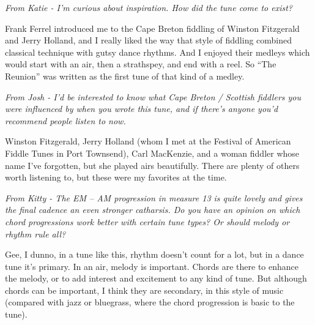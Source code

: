 \documentclass[10pt]{article}
\begin{document}
{\begin{minipage}{7.0in}
   \textit{From Katie - I'm curious about inspiration. How did the tune come to exist?}

   Frank Ferrel introduced me to the Cape Breton fiddling of Winston
   Fitzgerald and Jerry Holland, and I really liked the way that style
   of fiddling combined classical technique with gutsy dance
   rhythms. And I enjoyed their medleys which would start with an air,
   then a strathspey, and end with a reel. So ``The Reunion'' was
   written as the first tune of that kind of a medley.

   \textit{From Josh - I'd be interested to know what Cape Breton /
     Scottish fiddlers you were influenced by when you wrote this
     tune, and if there's anyone you'd recommend people listen to
     now.}

   Winston Fitzgerald, Jerry Holland (whom I met at the Festival of
   American Fiddle Tunes in Port Townsend), Carl MacKenzie, and a
   woman fiddler whose name I've forgotten, but she played airs
   beautifully. There are plenty of others worth listening to, but
   these were my favorites at the time.

   \textit{From Kitty - The EM – AM progression in measure 13 is quite
     lovely and gives the final cadence an even stronger catharsis. Do
     you have an opinion on which chord progressions work better with
     certain tune types? Or should melody or rhythm rule all?}

   Gee, I dunno, in a tune like this, rhythm doesn't count for a lot,
   but in a dance tune it's primary. In an air, melody is
   important. Chords are there to enhance the melody, or to add
   interest and excitement to any kind of tune. But although chords
   can be important, I think they are secondary, in this style of
   music (compared with jazz or bluegrass, where the chord progression
   is basic to the tune).
   
   
 \end{minipage}
}
\end{document}
